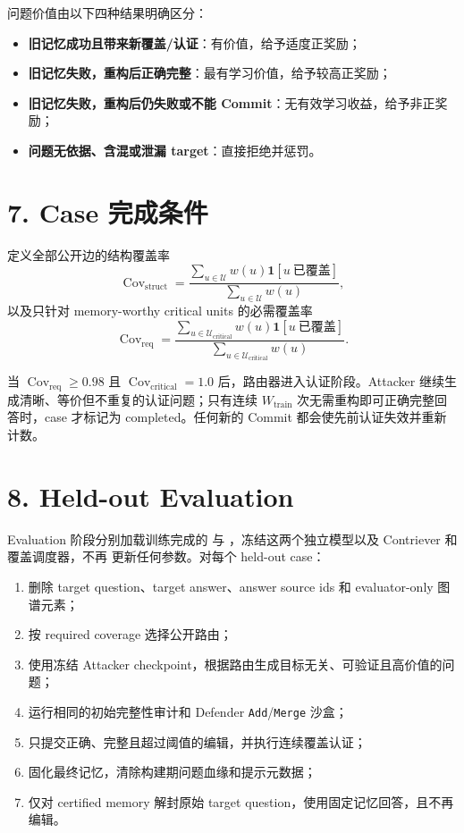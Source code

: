 \documentclass[a4paper,11pt]{article}
\begin{document}
问题价值由以下四种结果明确区分：
\begin{implbox}
\begin{itemize}
    \item \textbf{旧记忆成功且带来新覆盖/认证}：有价值，给予适度正奖励；
    \item \textbf{旧记忆失败，重构后正确完整}：最有学习价值，给予较高正奖励；
    \item \textbf{旧记忆失败，重构后仍失败或不能 Commit}：无有效学习收益，给予非正奖励；
    \item \textbf{问题无依据、含混或泄漏 target}：直接拒绝并惩罚。
\end{itemize}
\end{implbox}

\section*{7. Case 完成条件}

定义全部公开边的结构覆盖率
\[
    \operatorname{Cov}_{\mathrm{struct}}
    =
    \frac{
    \sum_{u\in\mathcal U}w(u)\mathbf{1}[u\ \text{已覆盖}]
    }{
    \sum_{u\in\mathcal U}w(u)
    },
\]
以及只针对 memory-worthy critical units 的必需覆盖率
\[
    \operatorname{Cov}_{\mathrm{req}}
    =
    \frac{
    \sum_{u\in\mathcal U_{\mathrm{critical}}}
    w(u)\mathbf{1}[u\ \text{已覆盖}]
    }{
    \sum_{u\in\mathcal U_{\mathrm{critical}}}w(u)
    }.
\]

当 $\operatorname{Cov}_{\mathrm{req}}\ge0.98$ 且
$\operatorname{Cov}_{\mathrm{critical}}=1.0$ 后，路由器进入认证阶段。Attacker 继续生成清晰、等价但不重复的认证问题；只有连续 $W_{\mathrm{train}}$ 次无需重构即可正确完整回答时，case 才标记为 completed。任何新的 Commit 都会使先前认证失效并重新计数。

\section*{8. Held-out Evaluation}

Evaluation 阶段分别加载训练完成的  与
，冻结这两个独立模型以及 Contriever 和覆盖调度器，不再
更新任何参数。对每个 held-out case：

\begin{enumerate}
    \item 删除 target question、target answer、answer source ids 和 evaluator-only 图谱元素；
    \item 按 required coverage 选择公开路由；
    \item 使用冻结 Attacker checkpoint，根据路由生成目标无关、可验证且高价值的问题；
    \item 运行相同的初始完整性审计和 Defender \texttt{Add}/\texttt{Merge} 沙盒；
    \item 只提交正确、完整且超过阈值的编辑，并执行连续覆盖认证；
    \item 固化最终记忆，清除构建期问题血缘和提示元数据；
    \item 仅对 certified memory 解封原始 target question，使用固定记忆回答，且不再编辑。
\end{enumerate}
\end{document}
